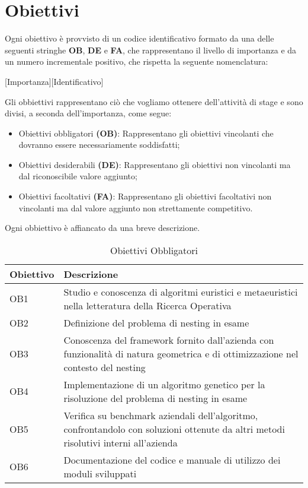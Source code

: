 \section{Obiettivi}
Ogni obiettivo è provvisto di un codice identificativo formato da una delle seguenti stringhe \textbf{OB}, \textbf{DE} e \textbf{FA}, che rappresentano il livello di importanza e da un numero incrementale positivo, che rispetta la seguente nomenclatura:
\begin{center}
    [Importanza][Identificativo]
\end{center}
Gli obbiettivi rappresentano ciò che vogliamo ottenere dell'attività di stage e sono divisi, a seconda dell'importanza, come segue:
\begin{itemize}
    \item Obiettivi obbligatori \textbf{(OB)}: 
    Rappresentano gli obiettivi vincolanti che dovranno essere necessariamente soddisfatti;
    \item Obiettivi desiderabili \textbf{(DE)}:
    Rappresentano gli obiettivi non vincolanti ma dal riconoscibile valore aggiunto;
    \item Obiettivi facoltativi \textbf{(FA)}:
    Rappresentano gli obiettivi facoltativi non vincolanti ma dal valore aggiunto non strettamente competitivo.
\end{itemize}
Ogni obbiettivo è affiancato da una breve descrizione.


\begin{table}[H]
\centering
\begin{tabular}{|l|p{10cm}|}
\hline
\textbf{Obiettivo} & \textbf{Descrizione} \\ \hline
OB1 & Studio e conoscenza di algoritmi euristici e metaeuristici nella letteratura della Ricerca Operativa \\ \hline
OB2 & Definizione del problema di nesting in esame \\ \hline
OB3 & Conoscenza del framework fornito dall’azienda con funzionalità di natura geometrica e di ottimizzazione nel contesto del nesting \\ \hline
OB4 & Implementazione di un algoritmo genetico per la risoluzione del problema di nesting in esame \\ \hline
OB5 & Verifica su benchmark aziendali dell’algoritmo, confrontandolo con soluzioni ottenute da altri metodi risolutivi interni all’azienda \\ \hline
OB6 & Documentazione del codice e manuale di utilizzo dei moduli sviluppati \\ \hline
\end{tabular}
\caption{Obiettivi Obbligatori}
\end{table}


